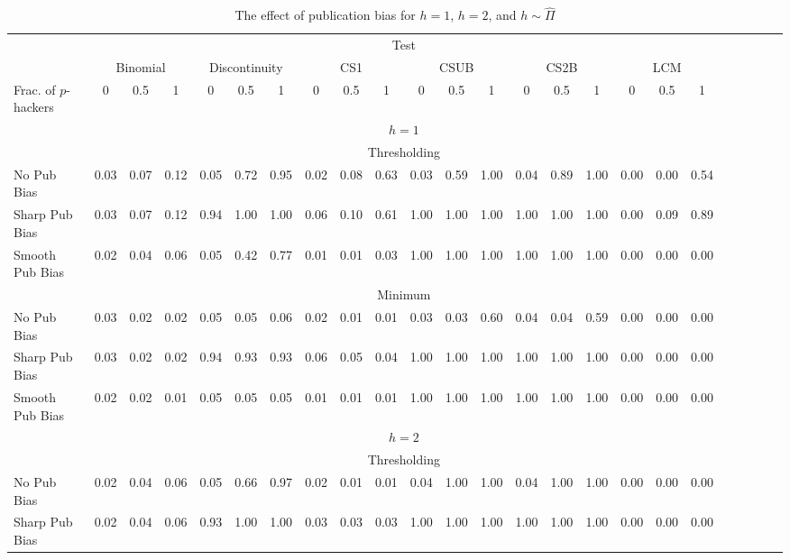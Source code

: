 \begin{table}[H]
\begin{center}
\caption{The effect of publication bias for $h=1$, $h=2$, and $h\sim \widehat{\Pi}$}
\label{tab:publication_bias_appendix}
\footnotesize
\begin{tabular}{lccccccccccccccccccccccc}
\toprule
 & \multicolumn{18}{c}{Test} \\ \cline{2-19}
 & \multicolumn{3}{c}{Binomial} & \multicolumn{3}{c}{Discontinuity} & \multicolumn{3}{c}{CS1} & \multicolumn{3}{c}{CSUB} & \multicolumn{3}{c}{CS2B} & \multicolumn{3}{c}{LCM} \\
Frac. of $p$-hackers & 0 & 0.5 & 1 & 0 & 0.5 & 1 & 0 & 0.5 & 1 & 0 & 0.5 & 1 & 0 & 0.5 & 1 & 0 & 0.5 & 1 \\ \hline
\multicolumn{1}{c}{} & \multicolumn{18}{c}{$h=1$} \\
\textit{} & \multicolumn{18}{c}{Thresholding} \\ \cline{2-19}
No Pub Bias & 0.03 & 0.07 & 0.12 & 0.05 & 0.72 & 0.95 & 0.02 & 0.08 & 0.63 & 0.03 & 0.59 & 1.00 & 0.04 & 0.89 & 1.00 & 0.00 & 0.00 & 0.54 \\
Sharp Pub Bias & 0.03 & 0.07 & 0.12 & 0.94 & 1.00 & 1.00 & 0.06 & 0.10 & 0.61 & 1.00 & 1.00 & 1.00 & 1.00 & 1.00 & 1.00 & 0.00 & 0.09 & 0.89 \\
Smooth Pub Bias & 0.02 & 0.04 & 0.06 & 0.05 & 0.42 & 0.77 & 0.01 & 0.01 & 0.03 & 1.00 & 1.00 & 1.00 & 1.00 & 1.00 & 1.00 & 0.00 & 0.00 & 0.00 \\
\textit{} & \multicolumn{18}{c}{Minimum} \\ \cline{2-19}
No Pub Bias & 0.03 & 0.02 & 0.02 & 0.05 & 0.05 & 0.06 & 0.02 & 0.01 & 0.01 & 0.03 & 0.03 & 0.60 & 0.04 & 0.04 & 0.59 & 0.00 & 0.00 & 0.00 \\
Sharp Pub Bias & 0.03 & 0.02 & 0.02 & 0.94 & 0.93 & 0.93 & 0.06 & 0.05 & 0.04 & 1.00 & 1.00 & 1.00 & 1.00 & 1.00 & 1.00 & 0.00 & 0.00 & 0.00 \\
Smooth Pub Bias & 0.02 & 0.02 & 0.01 & 0.05 & 0.05 & 0.05 & 0.01 & 0.01 & 0.01 & 1.00 & 1.00 & 1.00 & 1.00 & 1.00 & 1.00 & 0.00 & 0.00 & 0.00 \\
\hline
\multicolumn{1}{c}{} & \multicolumn{18}{c}{$h=2$} \\
\textit{} & \multicolumn{18}{c}{Thresholding} \\ \cline{2-19}
No Pub Bias & 0.02 & 0.04 & 0.06 & 0.05 & 0.66 & 0.97 & 0.02 & 0.01 & 0.01 & 0.04 & 1.00 & 1.00 & 0.04 & 1.00 & 1.00 & 0.00 & 0.00 & 0.00 \\
Sharp Pub Bias & 0.02 & 0.04 & 0.06 & 0.93 & 1.00 & 1.00 & 0.03 & 0.03 & 0.03 & 1.00 & 1.00 & 1.00 & 1.00 & 1.00 & 1.00 & 0.00 & 0.00 & 0.00 \\

\end{tabular}
\end{center}
\end{table}
